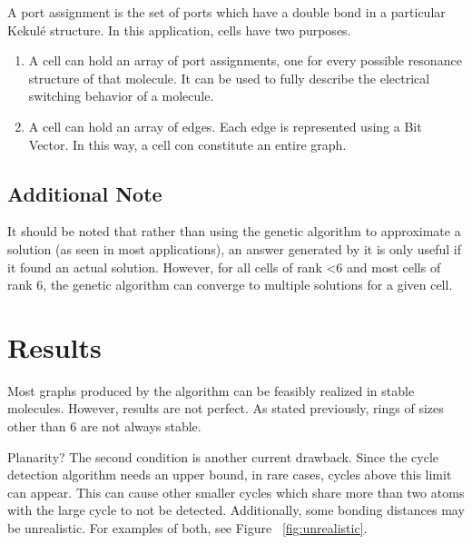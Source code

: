\documentclass[12pt]{article}
\begin{document}
A port assignment is the set of ports which have a double bond in a particular Kekul\'e structure. In this application, cells have two purposes. 

\begin{enumerate}
\item A cell can hold an array of port assignments, one for every possible resonance structure of that molecule. It can be used to fully describe the electrical switching behavior of a molecule.
\item A cell can hold an array of edges. Each edge is represented using a Bit Vector. In this way, a cell con constitute an entire graph.
\end{enumerate}


\subsection{Additional Note}

It should be noted that rather than using the genetic algorithm to approximate a solution (as seen in most applications), an answer generated by it is only useful if it found an actual solution. However, for all cells of rank \textless 6 and most cells of rank 6, the genetic algorithm can converge to multiple solutions for a given cell. 

\section{Results}

Most graphs produced by the algorithm can be feasibly realized in stable molecules. However, results are not perfect. As stated previously, rings of sizes other than 6 are not always stable. 

Planarity? The second condition is another current drawback. Since the cycle detection algorithm needs an upper bound, in rare cases, cycles above this limit can appear. This can cause other smaller cycles which share more than two atoms with the large cycle to not be detected. Additionally, some bonding distances may be unrealistic. For examples of both, see Figure ~\ref{fig:unrealistic}.
\end{document}
